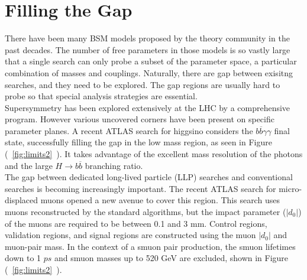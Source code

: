 \documentclass{moriond}
\begin{document}
\section{Filling the Gap}

There have been many BSM models proposed by the theory community in the past
decades. The number of free parameters in those models is so vastly large that
a single search can only probe a subset of the parameter space, a particular
combination of masses and couplings. Naturally, there are gap between exisitng
searches, and they need to be explored. The gap regions are usually hard to
probe so that special analysis strategies are essential.\\

Supersymmetry has been explored extensively at the LHC by a comprehensive
program. However various uncovered corners have been present on specific
parameter planes. A recent ATLAS search for higgsino considers the
$b\overline{b}\gamma\gamma$ final state, successfully filling the gap in the
low mass region, as seen in Figure (~\ref{fig:limits2}~). It
takes advantage of the excellent mass resolution of the photons and the large
$H\rightarrow b\overline{b}$ branching ratio.\\ 

The gap between dedicated long-lived particle (LLP) searches and conventional
searches is becoming increasingly important. The recent ATLAS search for
micro-displaced muons opened a new avenue to cover this region. This search
uses muons reconstructed by the standard algorithms, but the impact parameter
($|d_{0}|$) of the muons are required to be between 0.1 and 3 mm. Control
regions, validation regions, and signal regions are constructed using the muon
$|d_{0}|$ and muon-pair mass. In the context of a smuon pair production, the
smuon lifetimes down to 1 $ps$ and smuon masses up to 520 GeV are excluded,
shown in Figure (~\ref{fig:limits2}~).\\   
\end{document}
